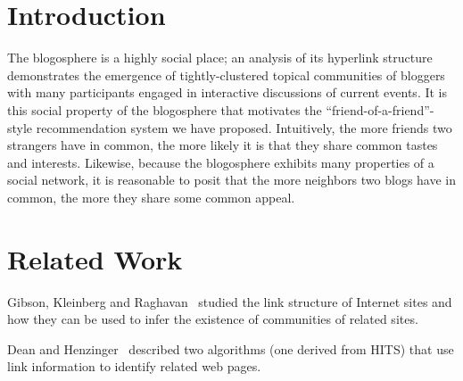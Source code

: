 \documentclass{sig-alternate}
\begin{document}



\section{Introduction}


%
The blogosphere is a highly social place; an analysis of its
hyperlink structure demonstrates the emergence of tightly-clustered
topical communities of bloggers with many participants engaged in
interactive discussions of current events. It is this social property
of the blogosphere that motivates the
``friend-of-a-friend''-style recommendation system we
have proposed. Intuitively, the more friends two strangers have in
common, the more likely it is that they share common tastes and
interests.  Likewise, because the blogosphere exhibits many properties
of a social network, it is reasonable to posit that the more neighbors
two blogs have in common, the more they share some common appeal.

\section{Related Work}

Gibson, Kleinberg and Raghavan~\cite{gibson1998iwc} studied the link
structure of Internet sites and how they can be used to infer the
existence of communities of related sites.

Dean and Henzinger~\cite{dean1999frp} described two algorithms (one
derived from HITS) that use link information to identify related web
pages.
\end{document}
